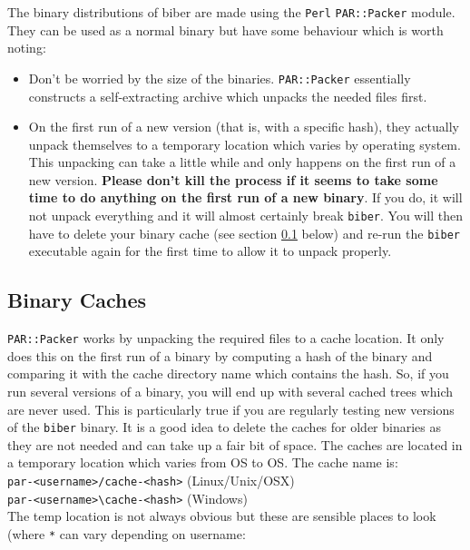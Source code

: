 \documentclass{ltxdockit}
\begin{document}
The binary distributions of biber are made using the \verb+Perl+ \verb+PAR::Packer+
module. They can be used as a normal binary but have some behaviour which
is worth noting:

\begin{itemize}
\item Don't be worried by the size of the binaries. \verb+PAR::Packer+ essentially
  constructs a self-extracting archive which unpacks the needed files first.
\item On the first run of a new version (that is, with a specific hash),
  they actually unpack themselves to a temporary location which varies by
  operating system. This unpacking can take a little while and only happens
  on the first run of a new version. \textbf{Please don't kill the process
    if it seems to take some time to do anything on the first run of a new
    binary}. If you do, it will not unpack everything and it will almost
  certainly break \verb+biber+. You will then have to delete your binary
  cache (see section \ref{bc} below) and re-run the \verb+biber+ executable
  again for the first time to allow it to unpack properly.
\end{itemize}

\subsection{Binary Caches}\label{bc}

\verb+PAR::Packer+ works by unpacking the required files to a cache
location. It only does this on the first run of a binary 
by computing a hash of the binary and comparing it with
the cache directory name which contains the hash. So, if you run
several versions of a binary, you will end up with several cached
trees which are never used. This is particularly true if you are regularly
testing new versions of the \verb+biber+ binary. It is a good idea to
delete the caches for older binaries as they are not needed and can take up
a fair bit of space. The caches are located in a temporary location which
varies from OS to OS. The cache name is:\\[1ex]

\noindent\verb+par-<username>/cache-<hash>+ (Linux/Unix/OSX)\\
\verb+par-<username>\cache-<hash>+ (Windows)\\[1ex]

\noindent The temp location is not always obvious but these are sensible
places to look (where \verb+*+ can vary depending on username:
\end{document}
